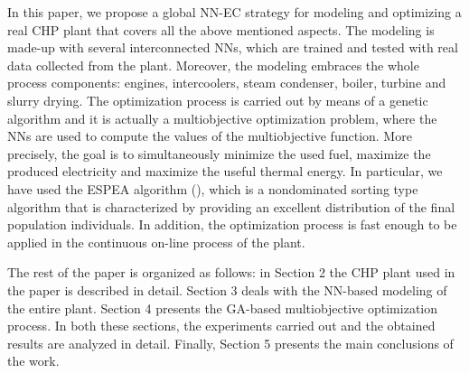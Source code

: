 In this paper, we propose a global NN-EC strategy for modeling and optimizing a real CHP plant that covers all the above mentioned aspects. The modeling is made-up with several interconnected NNs, which are trained and tested with real data collected from the plant. Moreover, the modeling embraces the whole process components: engines, intercoolers, steam condenser, boiler, turbine and slurry drying. The optimization process is carried out by means of a genetic algorithm and it is actually a multiobjective optimization problem, where the NNs are used to compute the values of the multiobjective function. More precisely, the goal is to simultaneously minimize the used fuel, maximize the produced electricity and maximize the useful thermal energy. In particular, we have used the ESPEA algorithm (\cite{espea}), which is a nondominated sorting type algorithm that is characterized by providing an excellent distribution of the final population individuals. In addition, the optimization process is fast enough to be applied in the continuous on-line process of the plant.  

The rest of the paper is organized as follows: in Section 2 the CHP plant used in the paper is described in detail. Section 3 deals with the NN-based modeling of the entire plant. Section 4 presents the GA-based multiobjective optimization process. In both these sections, the experiments carried out and the obtained results are analyzed in detail. Finally, Section 5 presents the main conclusions of the work.
\FloatBarrier